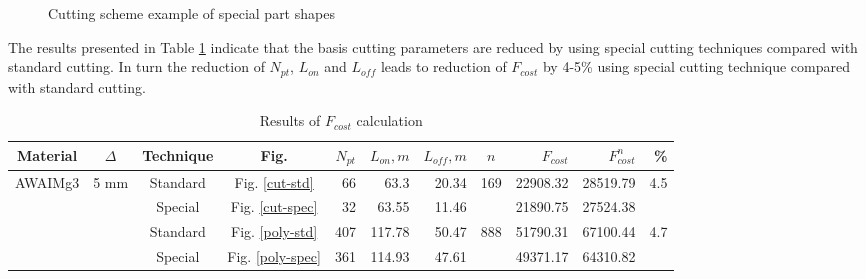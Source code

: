 \documentclass[runningheads]{llncs}
\begin{document}
\begin{figure}
  \centering
  \caption{Cutting scheme example of special part shapes}
  \label{polygons}
\end{figure}

The results presented in Table \ref{f-cost} indicate that
the basis cutting parameters are reduced by using special cutting techniques
compared with standard cutting.
In turn the reduction of $N_{pt}$, $L_{on}$ and $L_{off}$
leads to reduction of $F_{cost}$ by 4-5\%
using special cutting technique
compared with standard cutting.

\begin{table}
  \begin{tabular}{c | c | c | c | r r r | c | r r | r}
  Material & $\Delta$ & Technique & Fig. & $N_{pt}$ & $L_{on}, m$ & $L_{off}, m$ & $n$ & $F_{cost}$ & $F^n_{cost}$ & \% \\
  \hline \hline
  \multirow{4}{*}{AWAIMg3} & \multirow{4}{*}{5 mm} & Standard & Fig. \ref{cut-std}     & 66  & 63.3   & 20.34 & \multirow{2}{*}{169} & 22908.32 & 28519.79 & \multirow{2}{*}{4.5} \\
                         &                    & Special  & Fig. \ref{cut-spec} & 32  & 63.55  & 11.46 &                      & 21890.75 & 27524.38 & \\
                         &                    & Standard & Fig. \ref{poly-std}  & 407 & 117.78 & 50.47 & \multirow{2}{*}{888} & 51790.31 & 67100.44 & \multirow{2}{*}{4.7}\\
                         &                    & Special  & Fig. \ref{poly-spec}  & 361 & 114.93 & 47.61 &                      & 49371.17 & 64310.82 & \\
  \hline
  \end{tabular}
  \caption{Results of $F_{cost}$ calculation}
  \label{f-cost}
\end{table}
\end{document}
